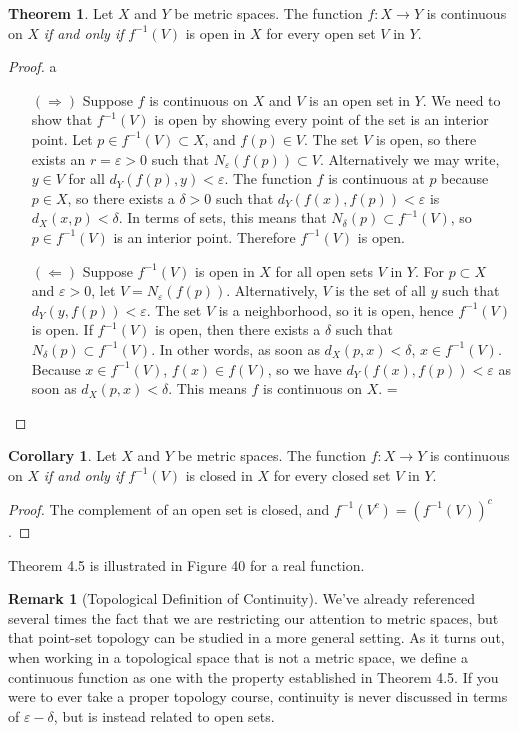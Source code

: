 \documentclass{article}
\theoremstyle{definition}
\newtheorem{theorem}{Theorem}[section]
\newtheorem{corollary}{Corollary}[section]
\newtheorem{remark}{Remark}[section]
\begin{document}
\begin{theorem}
	Let $ X $ and $ Y $ be metric spaces. The function $ f:X\to Y $ is continuous on $ X $ \textit{if and only if} $ f^{-1}(V) $ is open in $ X $ for every open set $ V $ in $ Y $.
\end{theorem}
\begin{proof}
	{\color{white}a}
	\begin{enumerate}
		\item [$ (\Longrightarrow) $] Suppose $ f $ is continuous on $ X $ and $ V$ is an open set in $ Y $. We need to show that $ f^{-1}(V) $ is open by showing every point of the set is an interior point. Let $ p\in f^{-1}(V)\subset X $, and $ f(p)\in V $. The set $ V $ is open, so there exists an $ r=\varepsilon>0 $ such that $ N_\varepsilon(f(p))\subset V $. Alternatively we may write, $ y\in V $ for all $ d_Y(f(p),y)<\varepsilon $. The function $ f $ is continuous at $ p $ because $ p\in X $, so there exists a $ \delta>0 $ such that $ d_Y(f(x),f(p))<\varepsilon $ is $ d_X(x,p)<\delta $. In terms of sets, this means that $ N_\delta(p)\subset f^{-1}(V) $, so $ p\in f^{-1}(V) $ is an interior point. Therefore $ f^{-1}(V) $ is open.
		\item [$ (\Longleftarrow) $] Suppose $ f^{-1}(V) $ is open in $ X $ for all open sets $ V $ in $ Y $. For $ p\subset X $ and $ \varepsilon>0 $, let $ V=N_\varepsilon(f(p)) $. Alternatively, $ V $ is the set of all $ y $ such that $ d_Y(y,f(p))<\varepsilon $. The set $ V $ is a neighborhood, so it is open, hence $ f^{-1}(V) $ is open. If $ f^{-1}(V) $ is open, then there exists a $ \delta $ such that $ N_\delta(p)\subset f^{-1}(V) $. In other words, as soon as $ d_X(p,x)<\delta $, $ x\in f^{-1}(V) $. Because $ x\in f^{-1}(V) $, $ f(x)\in f(V) $, so we have $ d_Y(f(x),f(p))<\varepsilon $ as soon as $ d_X(p,x)<\delta $. This means $ f $ is continuous on $ X $. =
	\end{enumerate}
\end{proof}
\begin{corollary}
	Let $ X $ and $ Y $ be metric spaces. The function $ f:X\to Y $ is continuous on $ X $ \textit{if and only if} $ f^{-1}(V) $ is closed in $ X $ for every closed set $ V $ in $ Y $.
\end{corollary}
\begin{proof}
	The complement of an open set is closed, and $ f^{-1}(V^c)=(f^{-1}(V))^c $. 
\end{proof}
Theorem 4.5 is illustrated in Figure 40 for a real function. 
\begin{remark}[Topological Definition of Continuity]
We've already referenced several times the fact that we are restricting our attention to metric spaces, but that point-set topology can be studied in a more general setting. As it turns out, when working in a topological space that is not a metric space, we define a continuous function as one with the property established in Theorem 4.5. If you were to ever take a proper topology course, continuity is never discussed in terms of $ \varepsilon-\delta $, but is instead related to open sets.
\end{remark}
\end{document}
